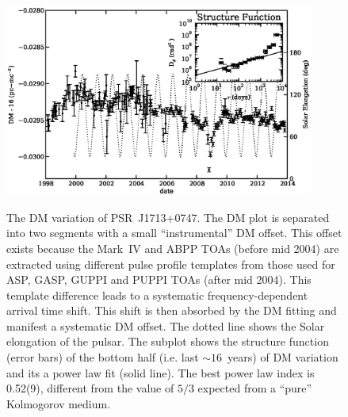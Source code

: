 \documentclass[12pt,preprint]{aastex}
\begin{document}
\begin{figure}
\includegraphics[width=4in]{DMX.ps} \\ 
\caption {\label{fig:dmx} The DM variation of PSR~J1713+0747. The DM plot is
separated into two segments with a small ``instrumental'' DM offset. This offset exists 
because the Mark~IV and ABPP TOAs (before mid 2004) are extracted using
different pulse
profile templates from those used for ASP, GASP, GUPPI and PUPPI TOAs (after
mid 2004). This template difference leads to a systematic
frequency-dependent arrival time shift. This shift is then absorbed by the DM
fitting and manifest a systematic DM offset. The dotted line shows the Solar
elongation of the pulsar. The subplot shows the structure
function (error bars) of the bottom half (i.e. last $\sim 16$~years) of DM
variation and its a power law fit (solid line). The best power law index is
0.52(9), different from the value of $5/3$ expected from a
``pure'' Kolmogorov medium. } 
\end{figure} 

\end{document}
